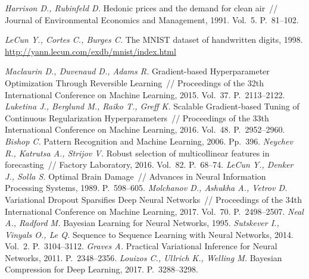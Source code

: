 \begin{thebibliography}{10}
	\textit{Harrison D.,  Rubinfeld D.} Hedonic prices and the demand for clean air~// Journal of Environmental Economics and Management, 1991. Vol.~5. P.~81--102.

	\textit{LeCun Y.,  Cortes C., Burges C.} The MNIST dataset of handwritten digits, 1998. \url{http://yann.lecun.com/exdb/mnist/index.html}

	\textit{Maclaurin D.,  Duvenaud D., Adams R.} Gradient-based Hyperparameter Optimization Through Reversible Learning~// Proceedings of the 32th International Conference on Machine Learning, 2015. Vol.~37. P.~2113--2122.
	\textit{Luketina J.,  Berglund M., Raiko T., Greff K.} Scalable Gradient-based Tuning of Continuous Regularization Hyperparameters~// Proceedings of the 33th International Conference on Machine Learning, 2016. Vol.~48. P.~2952--2960.
	\textit{Bishop C.} Pattern Recognition and Machine Learning, 2006. Pp.~396.
	\textit{Neychev R.,  Katrutsa A., Strijov V.} Robust selection of multicollinear features in forecasting~// Factory Laboratory, 2016. Vol.~82. P.~68--74.
	\textit{LeCun Y.,  Denker J., Solla S.} Optimal Brain Damage~// Advances in Neural Information Processing Systems, 1989. P.~598--605.
	\textit{Molchanov D.,  Ashukha A., Vetrov D.} Variational Dropout Sparsifies Deep Neural Networks~// Proceedings of the 34th International Conference on Machine Learning, 2017. Vol.~70. P.~2498--2507.
	\textit{Neal A.,  Radford M.} Bayesian Learning for Neural Networks, 1995.
	\textit{Sutskever I.,  Vinyals O., Le Q.} Sequence to Sequence Learning with Neural Networks, 2014. Vol.~2. P.~3104--3112.
	\textit{Graves A.} Practical Variational Inference for Neural Networks, 2011. P.~2348--2356.
	\textit{Louizos C., Ullrich K., Welling M.} Bayesian Compression for Deep Learning, 2017. P.~3288--3298.

\end{thebibliography}